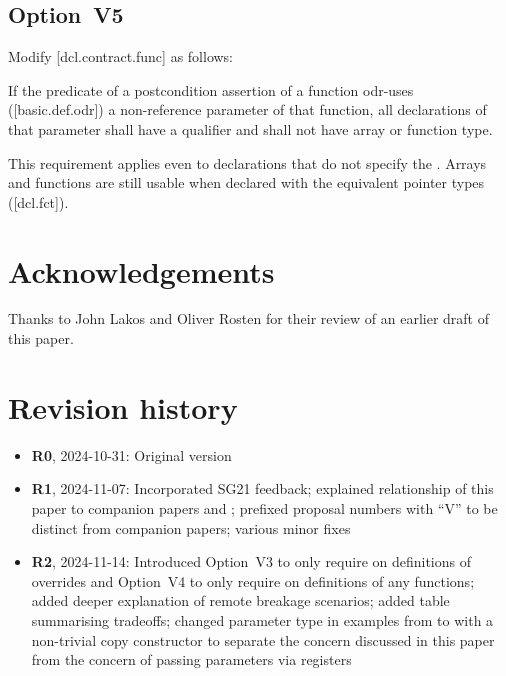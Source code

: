 \subsection*{Option~V5}

Modify [dcl.contract.func] as follows:

\begin{adjustwidth}{0.5cm}{0.5cm}
If the predicate of a postcondition assertion of a function odr-uses ([basic.def.odr]) a
non-reference parameter of that function, all declarations of that parameter shall have a  qualifier and
shall not have array or function type.
\begin{note}
This requirement applies even to declarations
that do not specify the . Arrays and functions are still usable when declared with the equivalent pointer types ([dcl.fct]).
\end{note}
\begin{example}
\tcode{[...]}
\end{example}

\end{adjustwidth}


\section*{Acknowledgements}

Thanks to John Lakos and Oliver Rosten for their review of an earlier draft of this paper.


\section*{Revision history}

\begin{itemize}
\item \textbf{R0}, 2024-10-31: Original version
\item \textbf{R1}, 2024-11-07: Incorporated SG21 feedback; explained relationship of this paper to companion papers \cite{P3487R0} and \cite{P3489R0}; prefixed proposal numbers with ``V'' to be distinct from companion papers; various minor fixes
\item \textbf{R2}, 2024-11-14: Introduced Option~V3 to only require  on definitions of overrides and Option~V4 to only require  on definitions of any functions; added deeper explanation of remote breakage scenarios; added table summarising tradeoffs;  changed parameter type in examples from  to \cite{Integer} with a non-trivial copy constructor to separate the concern discussed in this paper from the concern of passing parameters via registers
\end{itemize}

